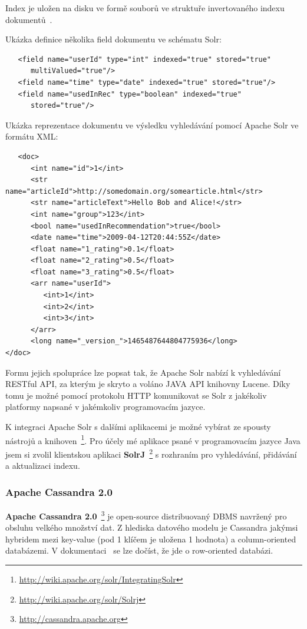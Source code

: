 \documentclass[thesis=M,czech]{FITthesis}[2014/05/07]
\begin{document}
Index je uložen na disku ve formě souborů ve struktuře invertovaného indexu dokumentů~\cite{wiki:invindex}.

Ukázka definice několika field dokumentu ve schématu Solr:

\begin{verbatim}
   <field name="userId" type="int" indexed="true" stored="true"
      multiValued="true"/>	
   <field name="time" type="date" indexed="true" stored="true"/>
   <field name="usedInRec" type="boolean" indexed="true"
      stored="true"/>
\end{verbatim}

Ukázka reprezentace dokumentu ve výsledku vyhledávání pomocí Apache Solr ve formátu XML:

\begin{verbatim}
   <doc>
      <int name="id">1</int>
      <str name="articleId">http://somedomain.org/somearticle.html</str>
      <str name="articleText">Hello Bob and Alice!</str>
      <int name="group">123</int>
      <bool name="usedInRecommendation">true</bool>
      <date name="time">2009-04-12T20:44:55Z</date>
      <float name="1_rating">0.1</float>
      <float name="2_rating">0.5</float>
      <float name="3_rating">0.5</float>      
      <arr name="userId">
         <int>1</int>
         <int>2</int>
         <int>3</int>
      </arr>
      <long name="_version_">1465487644804775936</long>      
</doc>
\end{verbatim}

Formu jejich spolupráce lze popsat tak, že Apache Solr nabízí k vyhledávání RESTful API, za kterým je skryto a voláno JAVA API knihovny Lucene. Díky tomu je možné pomocí protokolu HTTP komunikovat se Solr z jakékoliv platformy napsané v jakémkoliv programovacím jazyce. 

K integraci Apache Solr s dalšími aplikacemi je možné vybírat ze spousty nástrojů a knihoven~\footnote{\url{http://wiki.apache.org/solr/IntegratingSolr}}. Pro účely mé aplikace psané v programovacím jazyce Java jsem si zvolil klientskou aplikaci \textbf{SolrJ}~\footnote{\url{http://wiki.apache.org/solr/Solrj}} s rozhraním pro vyhledávání, přidávání a aktualizaci indexu. 

\subsubsection{Apache Cassandra 2.0}
\textbf{Apache Cassandra 2.0}~\footnote{\url{http://cassandra.apache.org}} je open-source distribuovaný DBMS navržený pro obsluhu velkého množství dat. Z hlediska datového modelu je Cassandra jakýmsi hybridem mezi key-value (pod 1 klíčem je uložena 1 hodnota) a column-oriented databázemi. V dokumentaci~\cite{cassdoc} se lze dočíst, že jde o row-oriented databázi.
\end{document}
